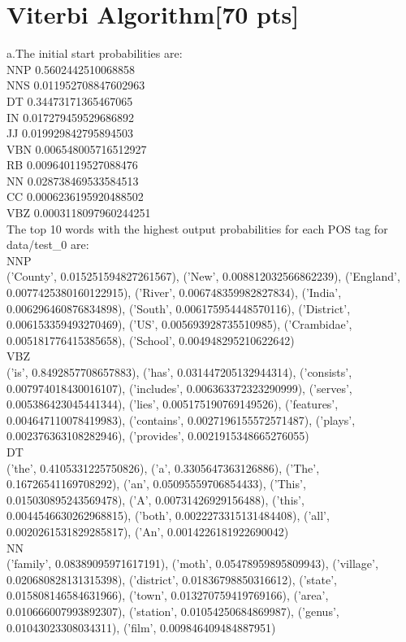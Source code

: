 \documentclass[11pt]{article}
\begin{document}
	\section{ Viterbi Algorithm[70 pts]}
	a.The initial start probabilities are:\\
	NNP   0.5602442510068858\\
	NNS   0.011952708847602963\\
	DT   0.34473171365467065\\
	IN   0.017279459529686892\\
	JJ   0.019929842795894503\\
	VBN   0.006548005716512927\\
	RB   0.009640119527088476\\
	NN   0.028738469533584513\\
	CC   0.0006236195920488502\\
	VBZ   0.0003118097960244251\\
	The top 10 words with the highest output probabilities for each POS tag for data/test\_0 are:\\
	NNP\\
	('County', 0.015251594827261567), ('New', 0.008812032566862239), ('England', 0.0077425380160122915), ('River', 0.006748359982827834), ('India', 0.006296460876834898), ('South', 0.006175954448570116), ('District', 0.006153359493270469), ('US', 0.005693928735510985), ('Crambidae', 0.005181776415385658), ('School', 0.004948295210622642)\\
	VBZ\\
	('is', 0.8492857708657883), ('has', 0.031447205132944314), ('consists', 0.007974018430016107), ('includes', 0.006363372323290999), ('serves', 0.005386423045441344), ('lies', 0.005175190769149526), ('features', 0.004647110078419983), ('contains', 0.0027196155572571487), ('plays', 0.002376363108282946), ('provides', 0.0021915348665276055)\\
	DT\\
	('the', 0.4105331225750826), ('a', 0.3305647363126886), ('The', 0.16726541169708292), ('an', 0.05095559706854433), ('This', 0.015030895243569478), ('A', 0.00731426929156488), ('this', 0.0044546630262968815), ('both', 0.0022273315131484408), ('all', 0.0020261531829285817), ('An', 0.0014226181922690042)\\
	NN\\
	('family', 0.08389095971617191), ('moth', 0.05478959895809943), ('village', 0.020680828131315398), ('district', 0.01836798850316612), ('state', 0.015808146584631966), ('town', 0.013270759419769166), ('area', 0.010666007993892307), ('station', 0.01054250684869987), ('genus', 0.01043023308034311), ('film', 0.009846409484887951)\\
\end{document}
